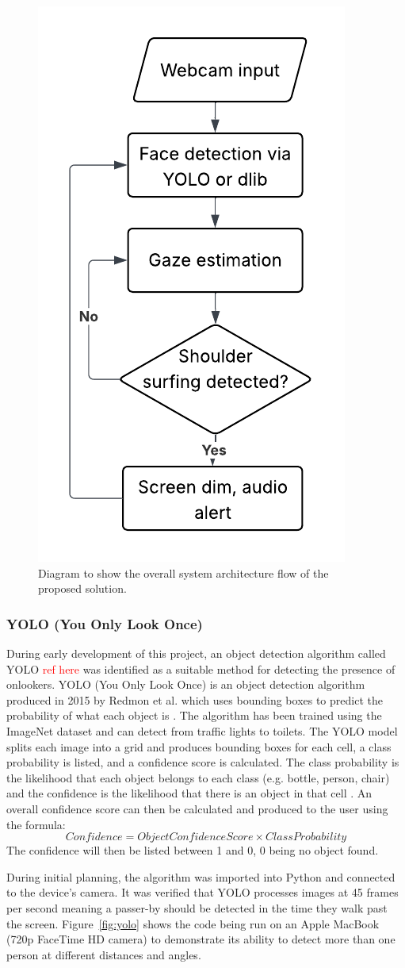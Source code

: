 \documentclass[12pt]{article}
\theoremstyle{plain}
\theoremstyle{definition}
\begin{document}
\begin{figure}[h!]
    \centering
    \includegraphics[width=0.3\linewidth]{img/architecture.png}
    \caption{Diagram to show the overall system architecture flow of the proposed solution.}
    \label{fig:architecture}
\end{figure}


\subsubsection{YOLO (You Only Look Once)}
During early development of this project, an object detection algorithm called YOLO \textcolor{red}{ref here} was identified as a suitable method for detecting the presence of onlookers.
YOLO (You Only Look Once) is an object detection algorithm produced in 2015 by Redmon et al. which uses bounding boxes to predict the probability of what each object is \cite{redmon_you_2016}. The algorithm has been trained using the ImageNet dataset \cite{noauthor_imagenet_nodate} and can detect from traffic lights to toilets. The YOLO model splits each image into a grid and produces bounding boxes for each cell, a class probability is listed, and a confidence score is calculated. The class probability is the likelihood that each object belongs to each class (e.g. bottle, person, chair) and the confidence is the likelihood that there is an object in that cell \cite{redmon_you_2016}. An overall confidence score can then be calculated and produced to the user using the formula: 
\[
  Confidence = Object Confidence Score \times Class Probability
\]
The confidence will then be listed between 1 and 0, 0 being no object found.

During initial planning, the algorithm was imported into Python and connected to the device’s camera. It was verified that YOLO processes images at 45 frames per second \cite{redmon_you_2016} meaning a passer-by should be detected in the time they walk past the screen. Figure~\ref{fig:yolo} shows the code being run on an Apple MacBook (720p FaceTime HD camera) to demonstrate its ability to detect more than one person at different distances and angles.
\end{document}
